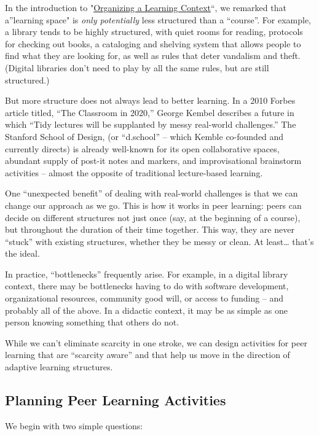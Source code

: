 In the introduction to
"\href{http://socialmediaclassroom.com/host/peeragogy/wiki/organizing-a-learning-context}{Organizing
a Learning Context}``, we remarked that a''learning space" is \emph{only
potentially} less structured than a ``course''. For example, a library
tends to be highly structured, with quiet rooms for reading, protocols
for checking out books, a cataloging and shelving system that allows
people to find what they are looking for, as well as rules that deter
vandalism and theft. (Digital libraries don't need to play by all the
same rules, but are still structured.)

But more structure does not always lead to better learning. In a 2010
Forbes article titled, ``The Classroom in 2020,'' George Kembel
describes a future in which ``Tidy lectures will be supplanted by messy
real-world challenges.'' The Stanford School of Design, (or ``d.school''
-- which Kemble co-founded and currently directs) is already well-known
for its open collaborative spaces, abundant supply of post-it notes and
markers, and improvisational brainstorm activities -- almost the
opposite of traditional lecture-based learning.

One ``unexpected benefit'' of dealing with real-world challenges is that
we can change our approach as we go. This is how it works in peer
learning: peers can decide on different structures not just once (say,
at the beginning of a course), but throughout the duration of their time
together. This way, they are never ``stuck'' with existing structures,
whether they be messy or clean. At least\ldots{} that's the ideal.

In practice, ``bottlenecks'' frequently arise. For example, in a digital
library context, there may be bottlenecks having to do with software
development, organizational resources, community good will, or access to
funding -- and probably all of the above. In a didactic context, it may
be as simple as one person knowing something that others do not.

While we can't eliminate scarcity in one stroke, we can design
activities for peer learning that are ``scarcity aware'' and that help
us move in the direction of adaptive learning structures.

\subsection{Planning Peer Learning Activities}

We begin with two simple questions:

